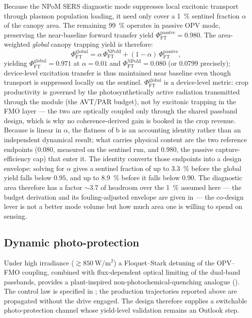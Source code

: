 \documentclass[preprint,12pt]{elsarticle}
\begin{document}
Because the NPoM SERS diagnostic mode suppresses local excitonic transport through plasmon population loading, it need only cover a \qty{1}{\percent} sentinel fraction $\alpha$ of the canopy area. The remaining \qty{99}{\percent} operates in passive OPV mode, preserving the near-baseline forward transfer yield $\Phi_{\mathrm{FT}}^{\mathrm{passive}} = 0.980$. The area-weighted \emph{global} canopy trapping yield is therefore:
\begin{equation}
  \Phi_{\mathrm{FT}}^{\mathrm{global}} = \alpha\,\Phi_{\mathrm{FT}}^{\mathrm{NPoM}} + (1-\alpha)\,\Phi_{\mathrm{FT}}^{\mathrm{passive}},
  \label{eq:phi_global}
\end{equation}
yielding $\Phi_{\mathrm{FT}}^{\mathrm{global}} = 0.971$ at $\alpha = 0.01$ and $\Phi_{\mathrm{FT}}^{\mathrm{NPoM}} = 0.080$ (or $0.0799$ precisely); device-level excitation transfer is thus maintained near baseline even though transport is suppressed locally on the sentinel.
$\Phi_{\mathrm{FT}}^{\mathrm{global}}$ is a device-level metric: crop productivity is governed by the photosynthetically active radiation transmitted through the module (the AVT/PAR budget), not by excitonic trapping in the FMO layer --- the two are optically coupled only through the shared passband design, which is why no coherence-derived gain is booked in the crop revenue.
Because  is linear in $\alpha$, the flatness of b is an accounting identity rather than an independent dynamical result; what carries physical content are the two reference endpoints ($\num{0.080}$, measured on the sentinel run, and $\num{0.980}$, the passive capture-efficiency cap) that enter it.
The identity converts those endpoints into a design envelope: solving  for $\alpha$ gives a sentinel fraction of up to \qty{3.3}{\percent} before the global yield falls below $0.95$, and up to \qty{8.9}{\percent} before it falls below $0.90$.
The diagnostic area therefore has a factor $\sim 3.7$ of headroom over the \qty{1}{\percent} assumed here --- the budget derivation and its fouling-adjusted envelope are given in  --- the co-design lever is not a better mode volume but how much area one is willing to spend on sensing.

\subsection{Dynamic photo-protection}
Under high irradiance ($\gtrsim\qty{850}{\W\per\m\squared}$) a Floquet--Stark detuning of the OPV--FMO coupling, combined with flux-dependent optical limiting of the dual-band passbands, provides a plant-inspired non-photochemical-quenching analogue (). The control law is specified in ; the production trajectories reported above are propagated without the drive engaged. The design therefore supplies a switchable photo-protection channel whose yield-level validation remains an Outlook step.
\end{document}
